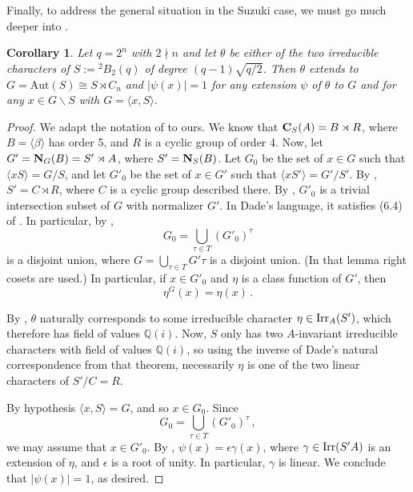 \documentclass[11pt]{amsart}
\theoremstyle{plain}
\newtheorem{cor}[thm]{Corollary}
\theoremstyle{definition}
\numberwithin{thm}{section}
\numberwithin{equation}{thm}
\newcommand{\Aut}{\mathrm{Aut}}
\def\irr#1{{\rm Irr}(#1)}
\def\cent#1#2{{\bf C}_{#1}(#2)}
\def\norm#1#2{{\bf N}_{#1}(#2)}
\newcommand{\Q}{{\mathbb Q}}
\newcommand{\0}{\emptyset}
\newcommand{\tw}[1]{{}^#1\!}
\begin{document}
Finally, to address the general situation in the Suzuki case, we must go much deeper into \cite[\S9]{Da}.

\begin{cor}\label{ext-suz2}
Let $q=2^n$ with $2 \nmid n$ and let $\theta$ be either of the two irreducible characters of $S:=\tw2 B_2(q)$ of degree $(q-1)\sqrt{q/2}$. 
Then $\theta$ extends to $G = \Aut(S) \cong S \rtimes C_n$ and 
$|\psi(x)|=1$ for any extension $\psi$ of $\theta$ to $G$ and for any $x \in G \smallsetminus S$ with $G=\langle x,S \rangle$. 
\end{cor}

\begin{proof}
We adapt the notation of \cite[\S9]{Da} to ours.
  We know that $\cent SA=B  \rtimes R$, where $B=\langle \beta \rangle$ has order 5,
 and $R$ is a cyclic group of order 4.  Now, let   $G'=\norm GB=S'\rtimes A$,
 where $S'=\norm SB$. Let $G_0$ be the set of $x \in G$ such that $\langle xS\rangle=G/S$,
 and let $G'_0$ be the set of $x \in G'$ such that $\langle xS'\rangle=G'/S'$. 
By \cite[Lemma 9.3]{Da},
 $S'=C \rtimes R$, where $C$ is a cyclic group described there.
 By \cite[Proposition 9.7]{Da}, $G'_0$ is a trivial intersection subset of $G$
 with normalizer $G'$. In Dade's language, it satisfies (6.4) of \cite{Da}. In particular, by 
 \cite[Lemma 6.5]{Da}, %
 $$G_0=\bigcup_{\tau \in T} (G'_0)^\tau$$ is a disjoint union,
 where $G=\bigcup_{\tau \in T} G' \tau$ is a disjoint union. (In 
that lemma
right cosets are used.)
 In particular, if $x \in G'_0$ and $\eta$ is a class function of $G'$, 
then 
$$\eta^G(x)=\eta(x) \, .$$
 
   By \cite[Theorem 9.8]{Da}, $\theta$ naturally
 corresponds to some irreducible character $\eta \in {\rm Irr}_A(S')$, which therefore has field of values
 $\Q(i)$. Now, $S$ only has two $A$-invariant irreducible characters with field of values $\Q(i)$, so using the inverse of Dade's natural correspondence 
from that theorem, 
necessarily $\eta$ is one of the two linear characters of $S'/C=R$.
  
By hypothesis $\langle x, S\rangle=G$, and so $x \in G_0$.
 Since $$G_0=\bigcup_{\tau \in T} (G'_0)^\tau \, ,$$
we may assume that $x \in G'_0$. By \cite[Lemma G]{Is2}, 
 $\psi(x)=\epsilon\gamma(x)$, where $\gamma \in \irr{S'A}$ is an extension of $\eta$, and $\epsilon$ is a root of unity. In particular,
 $\gamma$ is linear. We conclude that $|\psi(x)|=1$, as desired. 
  \end{proof}
  
\end{document}
